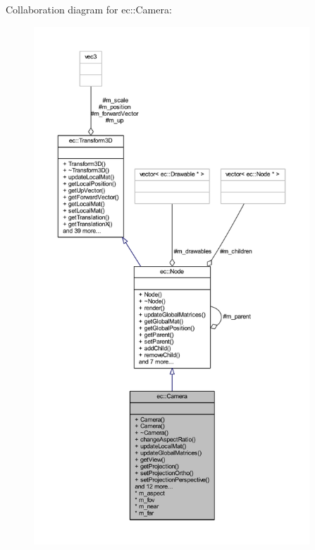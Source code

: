Collaboration diagram for ec\+:\+:Camera\+:\nopagebreak
\begin{figure}[H]
\begin{center}
\leavevmode
\includegraphics[height=550pt]{classec_1_1_camera__coll__graph}
\end{center}
\end{figure}
